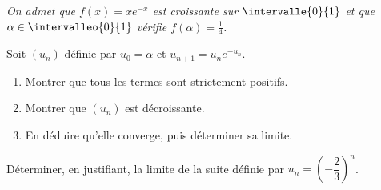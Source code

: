 \begin{annales}
\emph{On admet que $f(x) = xe^{-x}$ est croissante sur $\intervalle{0}{1}$ et
que $\alpha \in \intervalleo{0}{1}$ vérifie $f(\alpha) = \frac14$.}

Soit $(u_{n})$ définie par $u_{0} = \alpha$ et
$u_{n+1} = u_{n}e^{-u_{n}}$.
\begin{enumerate}[label=\textbf{\alph*)}, leftmargin=*, itemsep=0.15em]
  \item Montrer que tous les termes sont strictement positifs.
  \item Montrer que $(u_{n})$ est décroissante.
  \item En déduire qu'elle converge, puis déterminer sa limite.
\end{enumerate}

Déterminer, en justifiant, la limite de la suite définie par
$u_{n} = \left(-\dfrac23\right)^{n}$.
\end{annales}

